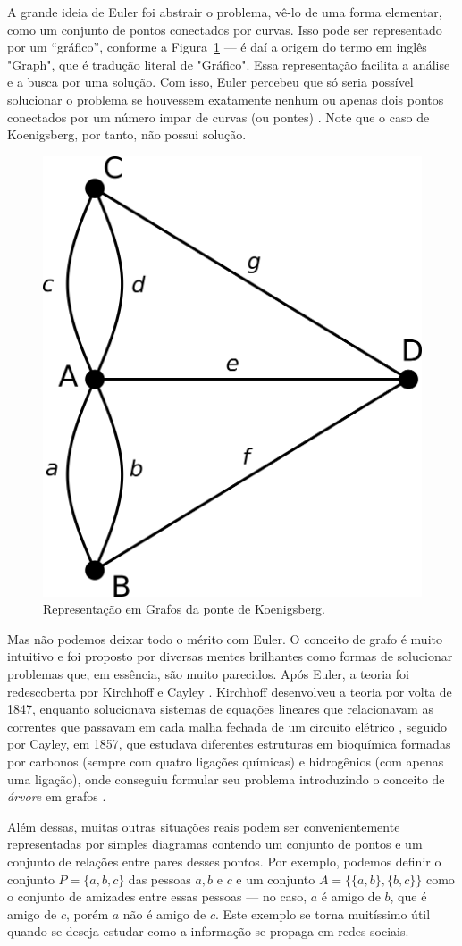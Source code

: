 \documentclass[a4paper,12pt]{article}
\begin{document}
A grande ideia de Euler foi abstrair o problema, vê-lo de uma forma elementar, como um conjunto de pontos conectados por curvas. Isso pode ser representado por um ``gráfico'', conforme a Figura~\ref{fig:koniGrafo} --- é daí a origem do termo em inglês "Graph", que é tradução literal de "Gráfico". Essa representação facilita a análise e a busca por uma solução. Com isso, Euler percebeu que só seria possível solucionar o problema se houvessem exatamente nenhum ou apenas dois pontos conectados por um número impar de curvas (ou pontes) \cite{euler:KOENIGSBERG}. Note que o caso de Koenigsberg, por tanto, não possui solução.

\begin{figure}[H]
	\begin{center}
		\includegraphics[width=0.32\linewidth]{figures/koenigsbernGrafo.png}
	\end{center}
	\caption{Representação em Grafos da ponte de Koenigsberg.}
	\label{fig:koniGrafo}
\end{figure}

Mas não podemos deixar todo o mérito com Euler. O conceito de grafo é muito intuitivo e foi proposto por diversas mentes brilhantes como formas de solucionar problemas que, em essência, são muito parecidos. Após Euler, a teoria foi redescoberta por Kirchhoff e Cayley \cite{graphTheoryFHarary}. Kirchhoff desenvolveu a teoria por volta de 1847, enquanto solucionava sistemas de equações lineares que relacionavam as correntes que passavam em cada malha fechada de um circuito elétrico \cite{kirchhoff1847ueber}, seguido por Cayley, em 1857, que estudava diferentes estruturas em bioquímica formadas por carbonos (sempre com quatro ligações químicas) e hidrogênios (com apenas uma ligação), onde conseguiu formular seu problema introduzindo o conceito de \textit{árvore} em grafos \cite{cayley1897theory}.  

Além dessas, muitas outras situações reais podem ser convenientemente representadas por simples diagramas contendo um conjunto de pontos e um conjunto de relações entre pares desses pontos. Por exemplo, podemos definir o conjunto $P = \{a,b,c\}$ das pessoas $a, b$ e $c$ e um conjunto $A = \{\{a,b\}, \{b,c\}\}$ como o conjunto de amizades entre essas pessoas --- no caso, $a$ é amigo de $b$, que é amigo de $c$, porém $a$ não é amigo de $c$. 
Este exemplo se torna muitíssimo útil quando se deseja estudar como a informação se propaga em redes sociais.
\end{document}
